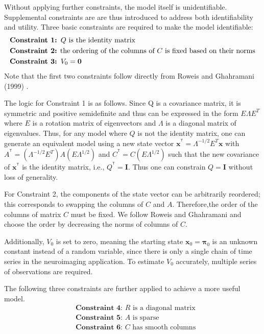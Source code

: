 \documentclass[fleqn,12pt]{article}
\newcommand{\T}{^{\ensuremath{\mathsf{T}}}}           %
\providecommand{\mb}[1]{\boldsymbol{#1}}
\newcommand{\bx}{\mb{x}}
\begin{document}
Without applying further constraints, the model itself is unidentifiable. Supplemental constraints are are thus introduced to address both identifiability and utility. Three basic constraints are required to make the model identifiable:
\vspace*{-3mm}
\begin{equation*}\label{eq:constraints1}
\begin{aligned}
&\textbf{Constraint 1: }Q \text{ is the identity matrix}\\
&\text{\textbf{Constraint 2:} the ordering of the columns of } C \text{ is fixed based on their norms}\\
&\textbf{Constraint 3: } V_0=\mathbf{0}
\end{aligned}
\end{equation*}
Note that the first two constraints follow directly from Roweis and Ghahramani (1999) \citep{roweis1999unifying}.

The logic for Constraint 1 is as follows. Since Q is a covariance matrix, it is symmetric and positive semidefinite and thus can be expressed in the form $E\Lambda E^T$ where $E$ is a rotation matrix of eigenvectors and $\Lambda$ is a diagonal matrix of eigenvalues. Thus, for any model where $Q$ is not the identity matrix, one can generate an equivalent model using a new state vector $\bx^{\T}=\Lambda^{-1/2} E^T \bx$ with $A^{\T}=(\Lambda^{-1/2}E^T)A(E\Lambda^{1/2})$ and $C^{\T}=C(E\Lambda^{1/2})$ such that the new covariance of $\bx^{\T}$ is the identity matrix, i.e., $Q^{\T}=\mathbf{I}$. Thus one can constrain $Q=\mathbf{I}$ without loss of generality.

For Constraint 2, the components of the state vector can be arbitrarily reordered; this corresponds to swapping the columns of $C$ and $A$. Therefore,the order of the columns of matrix $C$ must be fixed. We follow Roweis and Ghahramani and choose the order by decreasing the norms of columns of $C$.

Additionally, $V_0$ is set to zero, meaning the starting state $\bx_0=\mathbf{\pi}_0$ is an unknown constant instead of a random variable, since there is only a single chain of time series in the neuroimaging application. To estimate $V_0$ accurately, multiple series of observations are required.

The following three constraints are further applied to achieve a more useful model.
\vspace*{-3mm}
\begin{equation*}\label{eqn:constraints2}
\begin{aligned}
&\textbf{Constraint 4: }R\text{ is a diagonal matrix}\\
&\textbf{Constraint 5: }A\text{ is sparse}\\
&\textbf{Constraint 6: }C\text{ has smooth columns}
\end{aligned}
\end{equation*}
\end{document}
